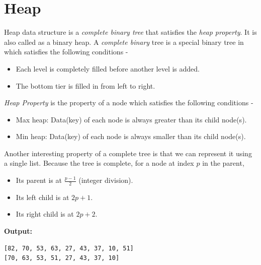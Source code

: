 \documentclass[12pt]{article}
\begin{document}
\section{Heap}
Heap data structure is a \textit{complete binary tree} that satisfies the\textit{ heap property}. It is also called as a binary heap. 
A \textit{complete binary} tree is a special binary tree in which satisfies the following conditions -
\begin{itemize}
	\item Each level is completely filled before another level is added.
	\item The bottom tier is filled in from left to right.
\end{itemize}
\textit{Heap Property} is the property of a node which satisfies the following conditions -
\begin{itemize}
	\item Max heap: Data(key) of each node is always greater than its child node(s).
	\item Min heap: Data(key) of each node is always smaller than its child node(s).
\end{itemize}
Another interesting property of a complete tree is that we can represent it using a single list. Because the tree is complete, for a node at index $p$ in the parent,
\begin{itemize}
	\item Its parent is at $\frac{p-1}{2}$ (integer division).
	\item Its left child is at $2p+1$.
	\item Its right child is at $2p+2$.
\end{itemize}

\textbf{Output:}
\begin{lstlisting}
[82, 70, 53, 63, 27, 43, 37, 10, 51]
[70, 63, 53, 51, 27, 43, 37, 10]
\end{lstlisting}
\end{document}
